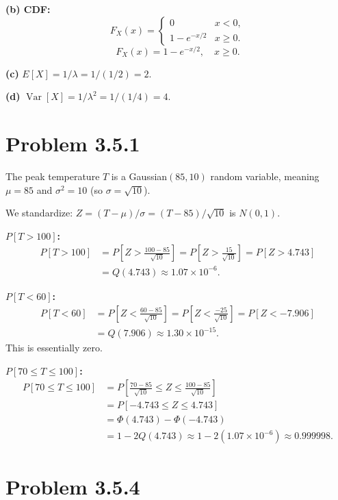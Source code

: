 \documentclass[11pt]{article}
\newcommand{\Var}{\operatorname{Var}}
\begin{document}
\textbf{(b) CDF:}
\[
F_X(x)=\begin{cases}0 & x<0,\\1-e^{-x/2} & x\ge 0.\end{cases}
\]
\[
\boxed{F_X(x)=1-e^{-x/2},\quad x\ge 0.}
\]

\textbf{(c)} $E[X]=1/\lambda = 1/(1/2)=\boxed{2}$.

\textbf{(d)} $\Var[X]=1/\lambda^2 = 1/(1/4)=\boxed{4}$.

\section*{Problem 3.5.1}

The peak temperature $T$ is a Gaussian$(85,10)$ random variable, meaning $\mu=85$ and $\sigma^2=10$ (so $\sigma=\sqrt{10}$).

We standardize: $Z=(T-\mu)/\sigma = (T-85)/\sqrt{10}$ is $N(0,1)$.

\medskip
\textbf{$P[T>100]$:}
\begin{align*}
P[T>100] &= P\!\left[Z>\frac{100-85}{\sqrt{10}}\right] = P\!\left[Z>\frac{15}{\sqrt{10}}\right] = P[Z>4.743]\\
&= Q(4.743) \approx \boxed{1.07\times 10^{-6}}.
\end{align*}

\textbf{$P[T<60]$:}
\begin{align*}
P[T<60] &= P\!\left[Z<\frac{60-85}{\sqrt{10}}\right] = P\!\left[Z<\frac{-25}{\sqrt{10}}\right] = P[Z<-7.906]\\
&= Q(7.906) \approx \boxed{1.30\times 10^{-15}}.
\end{align*}
This is essentially zero.

\textbf{$P[70\le T\le 100]$:}
\begin{align*}
P[70\le T\le 100] &= P\!\left[\frac{70-85}{\sqrt{10}}\le Z\le \frac{100-85}{\sqrt{10}}\right]\\
&= P[-4.743\le Z\le 4.743]\\
&= \Phi(4.743)-\Phi(-4.743)\\
&= 1-2Q(4.743) \approx 1-2(1.07\times 10^{-6}) \approx \boxed{0.999998}.
\end{align*}

\section*{Problem 3.5.4}
\end{document}
